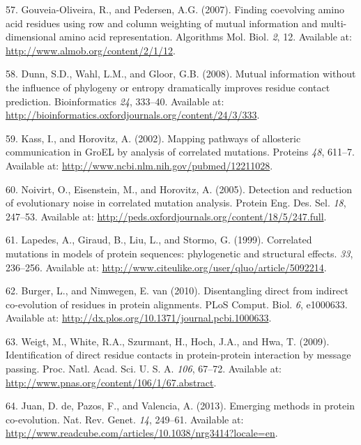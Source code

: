 \documentclass[11pt,a4paper,twoside]{book}
\theoremstyle{definition}
\theoremstyle{definition}
\theoremstyle{remark}
\begin{document}
\hypertarget{ref-Gouveia_Oliveira2007}{}
57. Gouveia-Oliveira, R., and Pedersen, A.G. (2007). Finding coevolving
amino acid residues using row and column weighting of mutual information
and multi-dimensional amino acid representation. Algorithms Mol. Biol.
\emph{2}, 12. Available at: \url{http://www.almob.org/content/2/1/12}.

\hypertarget{ref-Dunn2008}{}
58. Dunn, S.D., Wahl, L.M., and Gloor, G.B. (2008). Mutual information
without the influence of phylogeny or entropy dramatically improves
residue contact prediction. Bioinformatics \emph{24}, 333--40. Available
at: \url{http://bioinformatics.oxfordjournals.org/content/24/3/333}.

\hypertarget{ref-Kass2002}{}
59. Kass, I., and Horovitz, A. (2002). Mapping pathways of allosteric
communication in GroEL by analysis of correlated mutations. Proteins
\emph{48}, 611--7. Available at:
\url{http://www.ncbi.nlm.nih.gov/pubmed/12211028}.

\hypertarget{ref-Noivirt2005}{}
60. Noivirt, O., Eisenstein, M., and Horovitz, A. (2005). Detection and
reduction of evolutionary noise in correlated mutation analysis. Protein
Eng. Des. Sel. \emph{18}, 247--53. Available at:
\url{http://peds.oxfordjournals.org/content/18/5/247.full}.

\hypertarget{ref-Lapedes1999}{}
61. Lapedes, A., Giraud, B., Liu, L., and Stormo, G. (1999). Correlated
mutations in models of protein sequences: phylogenetic and structural
effects. \emph{33}, 236--256. Available at:
\url{http://www.citeulike.org/user/qluo/article/5092214}.

\hypertarget{ref-Burger2010}{}
62. Burger, L., and Nimwegen, E. van (2010). Disentangling direct from
indirect co-evolution of residues in protein alignments. PLoS Comput.
Biol. \emph{6}, e1000633. Available at:
\url{http://dx.plos.org/10.1371/journal.pcbi.1000633}.

\hypertarget{ref-Weigt2009}{}
63. Weigt, M., White, R.A., Szurmant, H., Hoch, J.A., and Hwa, T.
(2009). Identification of direct residue contacts in protein-protein
interaction by message passing. Proc. Natl. Acad. Sci. U. S. A.
\emph{106}, 67--72. Available at:
\url{http://www.pnas.org/content/106/1/67.abstract}.

\hypertarget{ref-DeJuan2013}{}
64. Juan, D. de, Pazos, F., and Valencia, A. (2013). Emerging methods in
protein co-evolution. Nat. Rev. Genet. \emph{14}, 249--61. Available at:
\url{http://www.readcube.com/articles/10.1038/nrg3414?locale=en}.
\end{document}
